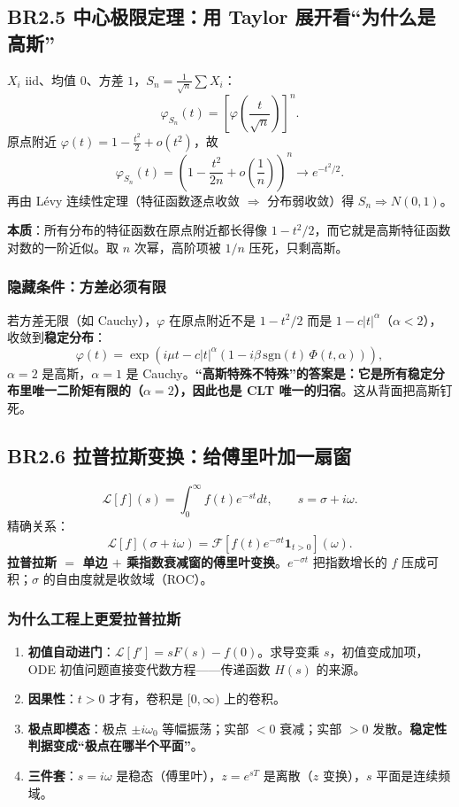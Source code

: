 \subsection{BR2.5 中心极限定理：用 Taylor 展开看“为什么是高斯”}

$X_i$ iid、均值 $0$、方差 $1$，$S_n=\frac{1}{\sqrt n}\sum X_i$：
\[
\varphi_{S_n}(t)=\left[\varphi\left(\frac{t}{\sqrt n}\right)\right]^n .
\]
原点附近 $\varphi(t)=1-\frac{t^2}{2}+o(t^2)$，故
\[
\varphi_{S_n}(t)=\left(1-\frac{t^2}{2n}+o\left(\frac1n\right)\right)^n\longrightarrow e^{-t^2/2}.
\]
再由 Lévy 连续性定理（特征函数逐点收敛 $\Rightarrow$ 分布弱收敛）得 $S_n\Rightarrow N(0,1)$。

\textbf{本质}：所有分布的特征函数在原点附近都长得像 $1-t^2/2$，而它就是高斯特征函数对数的一阶近似。取 $n$ 次幂，高阶项被 $1/n$ 压死，只剩高斯。

\subsubsection{隐藏条件：方差必须有限}

若方差无限（如 Cauchy），$\varphi$ 在原点附近不是 $1-t^2/2$ 而是 $1-c|t|^\alpha$（$\alpha<2$），收敛到\textbf{稳定分布}：
\[
\varphi(t)=\exp\left(i\mu t-c|t|^\alpha\left(1-i\beta\,\mathrm{sgn}(t)\,\Phi(t,\alpha)\right)\right),
\]
$\alpha=2$ 是高斯，$\alpha=1$ 是 Cauchy。\textbf{“高斯特殊不特殊”的答案是：它是所有稳定分布里唯一二阶矩有限的（$\alpha=2$），因此也是 CLT 唯一的归宿}。这从背面把高斯钉死。

\subsection{BR2.6 拉普拉斯变换：给傅里叶加一扇窗}

\[
\mathcal{L}[f](s)=\int_0^\infty f(t)e^{-st}dt,\qquad s=\sigma+i\omega .
\]
精确关系：
\[
\mathcal{L}[f](\sigma+i\omega)=\mathcal{F}\left[f(t)e^{-\sigma t}\mathbf{1}_{t>0}\right](\omega).
\]
\textbf{拉普拉斯 $=$ 单边 $+$ 乘指数衰减窗的傅里叶变换}。$e^{-\sigma t}$ 把指数增长的 $f$ 压成可积；$\sigma$ 的自由度就是收敛域（ROC）。

\subsubsection{为什么工程上更爱拉普拉斯}

\begin{enumerate}
  \item \textbf{初值自动进门}：$\mathcal{L}[f']=sF(s)-f(0)$。求导变乘 $s$，初值变成加项，ODE 初值问题直接变代数方程——传递函数 $H(s)$ 的来源。
  \item \textbf{因果性}：$t>0$ 才有，卷积是 $[0,\infty)$ 上的卷积。
  \item \textbf{极点即模态}：极点 $\pm i\omega_0$ 等幅振荡；实部 $<0$ 衰减；实部 $>0$ 发散。\textbf{稳定性判据变成“极点在哪半个平面”}。
  \item \textbf{三件套}：$s=i\omega$ 是稳态（傅里叶），$z=e^{sT}$ 是离散（$z$ 变换），$s$ 平面是连续频域。
\end{enumerate}

